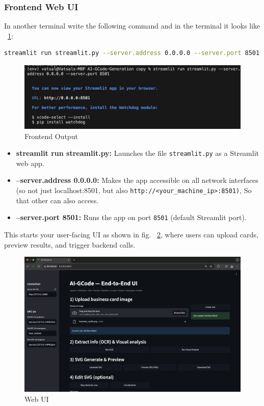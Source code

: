 \subsubsection{Frontend Web UI}
In another terminal write the following command and in the terminal it looks like ~\ref{streamlit}:
\begin{lstlisting}[language=bash,caption={Start Frontend Web UI}, label={lst:Frontend}]
	streamlit run streamlit.py --server.address 0.0.0.0 --server.port 8501
\end{lstlisting}


\begin{figure}
	\begin{center}
		\includegraphics[width=1\linewidth]{Images/streamlit.png}
		\caption{Frontend Output}
		\label{streamlit} 
	\end{center}
\end{figure}

\begin{itemize}
	\item \textbf{streamlit run streamlit.py:} Launches the file \texttt{streamlit.py} as a Streamlit web app.
	\item \textbf{--server.address 0.0.0.0:} Makes the app accessible on all network interfaces (so not just localhost:8501, but also \texttt{http://<your\_machine\_ip>:8501)}, So that other can also access.
	\item \textbf{--server.port 8501:} Runs the app on port \texttt{8501} (default Streamlit port).
\end{itemize}
This starts your user-facing UI as shown in fig. ~\ref{WebUI}, where users can upload cards, preview results, and trigger backend calls.

\begin{figure}
	\begin{center}
		\includegraphics[width=0.9\linewidth]{Images/WebUI.png}
		\caption{Web UI}
		\label{WebUI} 
	\end{center}
\end{figure}


